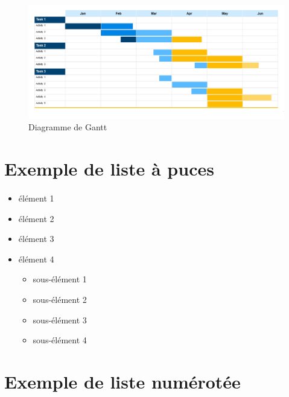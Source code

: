 \paragraph{}
\begin{figure}[!h]
    \centering
    \includegraphics[width=1\textwidth]{./images/gantt.jpg}
    \caption{Diagramme de Gantt}
\end{figure}


\section{Exemple de liste à puces}
\paragraph{}
\begin{itemize}[label=$\circ$]
    \item élément 1
    \item élément 2
    \item élément 3
    \item élément 4
    \begin{itemize}
        \item sous-élément 1
        \item sous-élément 2
        \item sous-élément 3
        \item sous-élément 4
    \end{itemize}
\end{itemize}

\section{Exemple de liste numérotée}
